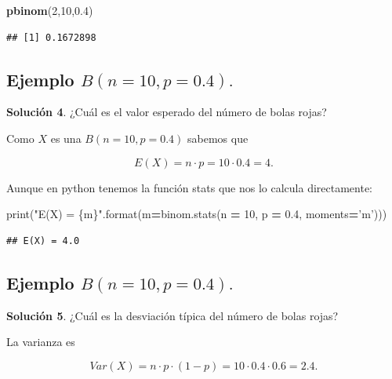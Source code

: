 \documentclass[]{book}
\newenvironment{Shaded}{\begin{snugshade}}{\end{snugshade}}
\newcommand{\BuiltInTok}[1]{#1}
\newcommand{\DecValTok}[1]{\textcolor[rgb]{0.00,0.00,0.81}{#1}}
\newcommand{\FloatTok}[1]{\textcolor[rgb]{0.00,0.00,0.81}{#1}}
\newcommand{\KeywordTok}[1]{\textcolor[rgb]{0.13,0.29,0.53}{\textbf{#1}}}
\newcommand{\NormalTok}[1]{#1}
\newcommand{\OperatorTok}[1]{\textcolor[rgb]{0.81,0.36,0.00}{\textbf{#1}}}
\newcommand{\SpecialCharTok}[1]{\textcolor[rgb]{0.00,0.00,0.00}{#1}}
\newcommand{\StringTok}[1]{\textcolor[rgb]{0.31,0.60,0.02}{#1}}
\begin{document}
\begin{Shaded}
\begin{Highlighting}[]
\KeywordTok{pbinom}\NormalTok{(}\DecValTok{2}\NormalTok{,}\DecValTok{10}\NormalTok{,}\FloatTok{0.4}\NormalTok{)}
\end{Highlighting}
\end{Shaded}

\begin{verbatim}
## [1] 0.1672898
\end{verbatim}

\hypertarget{ejemplo-bn10p0.4.-6}{%
\subsection{\texorpdfstring{Ejemplo \(B(n=10,p=0.4).\)}{Ejemplo B(n=10,p=0.4).}}\label{ejemplo-bn10p0.4.-6}}

\textbf{Solución 4}. ¿Cuál es el valor esperado del número de bolas rojas?

Como \(X\) es una \(B(n=10,p=0.4)\) sabemos que

\[E(X)=n\cdot p = 10\cdot 0.4=4.\]

Aunque en python tenemos la función stats que nos lo calcula directamente:

\begin{Shaded}
\begin{Highlighting}[]
\BuiltInTok{print}\NormalTok{(}\StringTok{"E(X) = }\SpecialCharTok{\{m\}}\StringTok{"}\NormalTok{.}\BuiltInTok{format}\NormalTok{(m}\OperatorTok{=}\NormalTok{binom.stats(n }\OperatorTok{=} \DecValTok{10}\NormalTok{, p }\OperatorTok{=} \FloatTok{0.4}\NormalTok{, moments}\OperatorTok{=}\StringTok{'m'}\NormalTok{)))}
\end{Highlighting}
\end{Shaded}

\begin{verbatim}
## E(X) = 4.0
\end{verbatim}

\hypertarget{ejemplo-bn10p0.4.-7}{%
\subsection{\texorpdfstring{Ejemplo \(B(n=10,p=0.4).\)}{Ejemplo B(n=10,p=0.4).}}\label{ejemplo-bn10p0.4.-7}}

\textbf{Solución 5}. ¿Cuál es la desviación típica del número de bolas rojas?

La varianza es

\[
Var(X)=n\cdot p \cdot(1-p)=10\cdot 0.4\cdot 0.6=2.4.
\]
\end{document}
